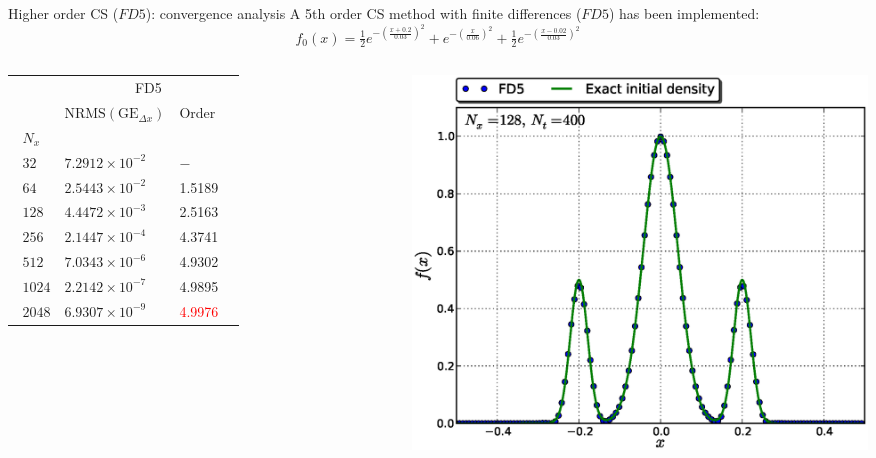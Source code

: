 \documentclass{beamer}
\begin{document}
\begin{frame}{Higher order CS ($FD5$): convergence analysis}
A 5th order CS method with finite differences ($FD5$)\vspace{-0.3em} has been implemented:\vspace{-1em}
$$f_0(x)  = \tfrac{1}{2}e^{-\left(\tfrac{x + 0.2}{0.03}\right)^2} + e^{-\left(\tfrac{x}{0.06}\right)^2} + \tfrac{1}{2}e^{-\left(\tfrac{x - 0.02}{0.03}\right)^2}$$\vspace{-1.5em}
\begin{columns}
\begin{tabular}{@{}llll@{}}\toprule
&\multicolumn{3}{c}{\phantom{$^2$ glob }FD5} \phantom{ClasicOrdera}\\
\cmidrule{2-4}& $\text{NRMS}(\text{GE}_{\Delta x})$ & Order \\ \midrule
$\phantom{a}N_x$\\
$\phantom{a}32$ & $7.2912\times 10^{-2}$ & $-$ \\
$\phantom{a}64$ & $2.5443\times 10^{-2}$ & 1.5189 \\
$\phantom{a}128$ & $4.4472\times 10^{-3}$ & 2.5163 \\
$\phantom{a}256$ & $2.1447\times 10^{-4}$ & 4.3741 \\
$\phantom{a}512$ & $7.0343\times 10^{-6}$ & 4.9302  \\
$\phantom{a}1024$ & $2.2142\times 10^{-7}$ & 4.9895 \\
$\phantom{a}2048$ & $6.9307\times 10^{-9}$ & \textcolor{red}{4.9976} \\
\bottomrule
\end{tabular}

    \includegraphics[width=\textwidth]{graphics/plot_-_GB3_FD5__Nx128Nt400_w_f0_itmax.eps}
  \end{columns}

\end{frame}
\end{document}
